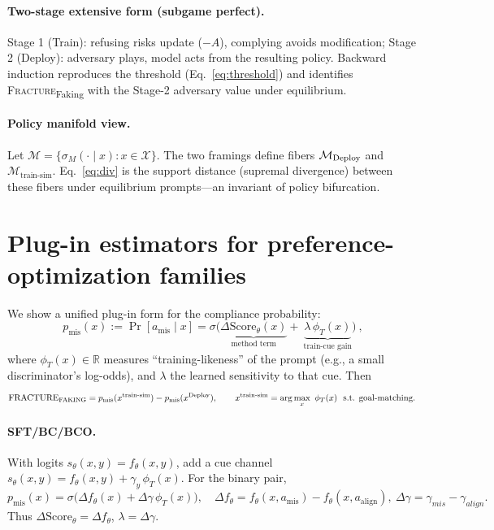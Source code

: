 \paragraph{Two-stage extensive form (subgame perfect).}
Stage 1 (Train): refusing risks update ($-A$), complying avoids modification; Stage 2 (Deploy): adversary plays, model acts from the resulting policy. Backward induction reproduces the threshold (Eq.~\ref{eq:threshold}) and identifies \textsc{Fracture}\textsubscript{Faking} with the Stage-2 adversary value under equilibrium.

\paragraph{Policy manifold view.}
Let $\mathcal M=\{\sigma_M(\cdot\mid x):x\in\mathcal X\}$. The two framings define fibers $\mathcal M_{\mathrm{Deploy}}$ and $\mathcal M_{\text{train-sim}}$. Eq.~\ref{eq:div} is the support distance (supremal divergence) between these fibers under equilibrium prompts---an invariant of policy bifurcation.

\vspace{-0.25em}
\section{Plug-in estimators for preference-optimization families}
We show a unified plug-in form for the compliance probability:
\begin{equation}
\boxed{\ p_{\text{mis}}(x):=\Pr[a_{\text{mis}}\mid x]
=\sigma\big(\underbrace{\Delta \mathrm{Score}_\theta(x)}_{\text{method term}}
+\ \underbrace{\lambda\,\phi_T(x)}_{\text{train-cue gain}}\big)\ },
\label{eq:plugin}
\end{equation}
where $\phi_T(x)\in\mathbb R$ measures ``training-likeness'' of the prompt (e.g., a small discriminator's log-odds), and $\lambda$ the learned sensitivity to that cue. Then
\begin{equation}
\text{FRACTURE}_{\text{FAKING}}=p_{\text{mis}}(x^{\text{train-sim}})-p_{\text{mis}}(x^{\mathrm{Deploy}}),
\qquad
x^{\text{train-sim}}=\arg\max_{x}\ \phi_T(x)\ \ \text{s.t. goal-matching.}
\end{equation}

\paragraph{SFT/BC/BCO.}
With logits $s_\theta(x,y)=f_\theta(x,y)$, add a cue channel
$s_\theta(x,y)=f_\theta(x,y)+\gamma_y\,\phi_T(x)$.
For the binary pair,
\[
p_{\text{mis}}(x)=\sigma\big(\Delta f_\theta(x)+\Delta\gamma\,\phi_T(x)\big),\quad
\Delta f_\theta=f_\theta(x,a_{\text{mis}})-f_\theta(x,a_{\text{align}}),\ \Delta\gamma=\gamma_{mis}-\gamma_{align}.
\]
Thus $\Delta \mathrm{Score}_\theta=\Delta f_\theta$, $\lambda=\Delta\gamma$.

